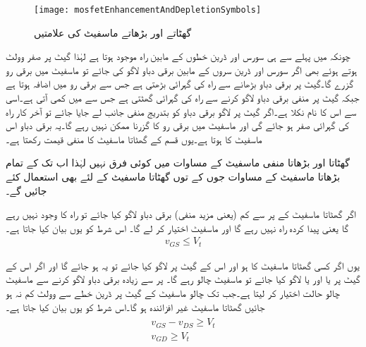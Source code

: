\begin{figure}
\centering
\texttt{[image: mosfetEnhancementAndDepletionSymbols]}
\caption{گھٹاتے اور بڑھاتے ماسفیٹ کی علامتیں}
\label{شکل_ماسفیٹ_کی_علامتیں}
\end{figure}

چونکہ  میں پہلے سے ہی سورس اور ڈرین خطوں کے مابین راہ موجود ہوتا ہے لہٰذا گیٹ پر صفر وولٹ  ہوتے ہوئے بھی اگر سورس اور ڈرین سروں  کے مابین برقی دباو   لاگو کی جائے تو ماسفیٹ میں برقی رو  گزرے گا۔گیٹ پر برقی دباو بڑھانے سے راہ کی گہرائی بڑھتی ہے جس سے برقی رو میں اضافہ ہوتا ہے جبکہ گیٹ پر منفی برقی دباو لاگو کرنے سے راہ کی گہرائی گھٹتی ہے جس سے   میں کمی آتی ہے۔اسی سے اس کا نام    نکلا ہے۔اگر گیٹ پر لاگو برقی دباو کو بتدریج منفی جانب لے جایا جائے تو آخر کار راہ کی گہرائی صفر ہو جائے گی اور ماسفیٹ میں برقی رو کا گزرنا ممکن نہیں رہے گا۔یہ برقی دباو اس ماسفیٹ کا  ہوتا ہے۔یوں   قسم کے گھٹاتا ماسفیٹ کا  منفی قیمت رکھتا ہے۔

گھٹاتا اور بڑھاتا منفی ماسفیٹ کے مساوات میں کوئی فرق نہیں لہٰذا اب تک  کے تمام بڑھاتا ماسفیٹ کے مساوات جوں کے توں گھٹاتا ماسفیٹ کے لئے بھی استعمال کئے جائیں گے۔ 

اگر گھٹاتا ماسفیٹ کے  پر  سے کم (یعنی مزید منفی) برقی دباو لاگو کیا جائے تو راہ کا وجود نہیں رہے گا یعنی پیدا کردہ راہ نہیں رہے گا اور ماسفیٹ   اختیار کر لے گا۔ اس شرط کو یوں بیان کیا جاتا ہے۔
\begin{align}
v_{GS} \le V_t
\end{align}

یوں اگر کسی گھٹاتا ماسفیٹ کا  ہو اور اس کے گیٹ پر  لاگو کیا جائے تو یہ  ہو جائے گا اور اگر اس کے گیٹ پر  یا  اور یا  لاگو کیا جائے تو ماسفیٹ چالو رہے گا۔
 پر   سے زیادہ برقی دباو لاگو کرنے سے ماسفیٹ چالو حالت اختیار کر لیتا ہے۔جب تک چالو ماسفیٹ کے گیٹ پر ڈرین خطے سے  وولٹ کم نہ ہو جائیں گھٹاتا ماسفیٹ غیر افزائندہ ہو گا۔اس شرط کو یوں بیان کیا جاتا ہے۔
\begin{gather}
\begin{aligned}
v_{GS}-v_{DS} \ge V_t \\
v_{GD} \ge V_t
\end{aligned}
\end{gather}

